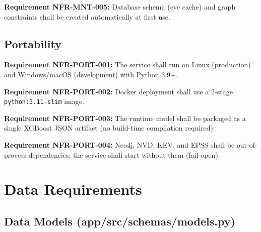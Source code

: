 \documentclass[10pt,journal,onecolumn]{IEEEtran}
\newcommand{\reqid}[1]{\textbf{#1}}
\begin{document}
\reqid{Requirement NFR-MNT-005:} Database schema (cve cache) and graph constraints shall be created automatically at first use.

\subsection{Portability}

\reqid{Requirement NFR-PORT-001:} The service shall run on Linux (production) and Windows/macOS (development) with Python 3.9+.

\reqid{Requirement NFR-PORT-002:} Docker deployment shall use a 2-stage \texttt{python:3.11-slim} image.

\reqid{Requirement NFR-PORT-003:} The runtime model shall be packaged as a single XGBoost JSON artifact (no build-time compilation required).

\reqid{Requirement NFR-PORT-004:} Neo4j, NVD, KEV, and EPSS shall be out-of-process dependencies; the service shall start without them (fail-open).

\section{Data Requirements}

\subsection{Data Models (app/src/schemas/models.py)}
\end{document}
